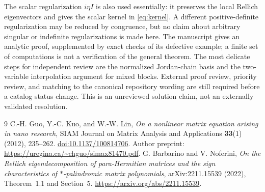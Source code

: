\documentclass[11pt]{article}
\begin{document}
The scalar regularization $i\eta I$ is also used essentially: it preserves the local
Rellich eigenvectors and gives the scalar kernel in \eqref{eq:kernel}.
A different positive-definite regularization may be reduced by congruence, but no claim
about arbitrary singular or indefinite regularizations is made here.
The manuscript gives an analytic proof, supplemented by exact checks of its defective
example; a finite set of computations is not a verification of the general theorem.
The most delicate steps for independent review are the normalized Jordan-chain basis
and the two-variable interpolation argument for mixed blocks.
External proof review, priority review, and matching to the canonical repository wording
are still required before a catalog status change. This is an unreviewed solution claim,
not an externally validated resolution.

\begin{thebibliography}{9}
C.-H. Guo, Y.-C. Kuo, and W.-W. Lin,
\emph{On a nonlinear matrix equation arising in nano research},
SIAM Journal on Matrix Analysis and Applications \textbf{33}(1) (2012), 235--262.
\href{https://doi.org/10.1137/100814706}{doi:10.1137/100814706}.
Author preprint:
\url{https://uregina.ca/~chguo/simax81470.pdf}.
G. Barbarino and V. Noferini,
\emph{On the Rellich eigendecomposition of para-Hermitian matrices and the sign
characteristics of $*$-palindromic matrix polynomials},
arXiv:2211.15539 (2022), Theorem~1.1 and Section~5.
\url{https://arxiv.org/abs/2211.15539}.
\end{thebibliography}
\end{document}
